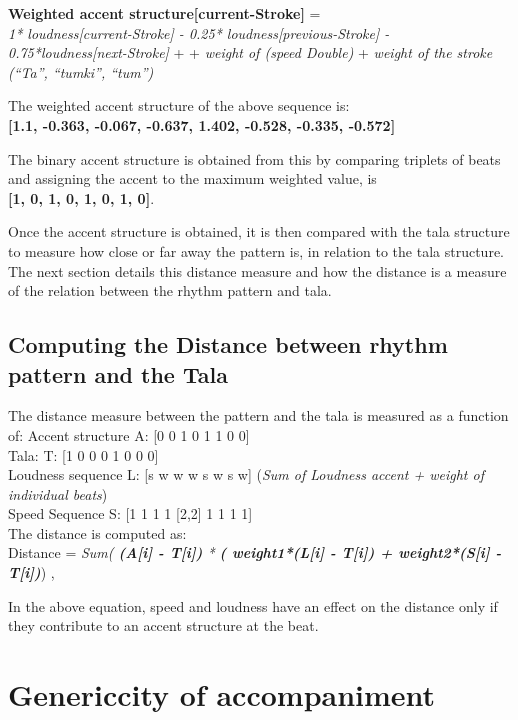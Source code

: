 \textbf{Weighted accent structure[current-Stroke]} = \\

 \emph{1* loudness[current-Stroke] - 0.25* loudness[previous-Stroke] - 0.75*loudness[next-Stroke]} + 
+ \emph{weight of (speed Double)} +
\emph{ weight of the stroke (``Ta'', ``tumki'', ``tum'') }

The weighted accent structure of the above sequence is: \\ \textbf{[1.1, -0.363, -0.067, -0.637, 1.402, -0.528, -0.335, -0.572]}
 
The binary accent structure is obtained from this by comparing triplets of beats and assigning the accent to the maximum weighted value, is \\ \textbf{[1, 0, 1, 0, 1, 0, 1, 0]}.

Once the accent structure is obtained, it is then compared with the tala structure to measure how close or far away the pattern is, in relation to the tala structure. The next section details this distance measure and how the distance is a measure of the relation between the rhythm pattern and tala.

\subsection{ Computing the Distance between rhythm pattern and the Tala}

The distance measure between the pattern and the tala is measured as a function of:
Accent structure  A: [0 0 1 0 1 1 0 0] \\
Tala:             T: [1 0 0 0 1 0 0 0] \\
Loudness sequence L: [s w w w s w s w] (\emph{Sum of Loudness accent + weight of individual beats}) \\
Speed Sequence    S: [1 1 1 1 [2,2] 1 1 1 1] \\

The distance is computed as: \\
Distance = \emph{Sum( \textbf{(A[i] - T[i])} * \textbf{( weight1*(L[i] - T[i]) + weight2*(S[i] - T[i])}})  ,

In the above equation, speed and loudness have an effect on the distance only if they contribute to an accent structure at the beat. 

\section{Genericcity of accompaniment}

